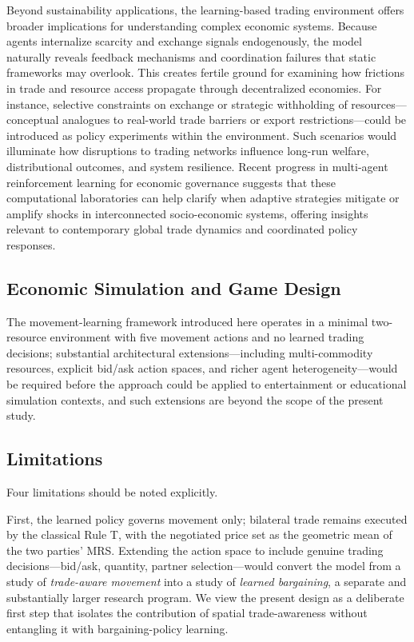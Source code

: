 \documentclass[pdflatex,sn-mathphys-num]{sn-jnl}%
\theoremstyle{thmstyleone}%
\theoremstyle{thmstyletwo}%
\theoremstyle{thmstylethree}%
\begin{document}
Beyond sustainability applications, the learning-based trading environment offers broader implications for understanding complex economic systems. Because agents internalize scarcity and exchange signals endogenously, the model naturally reveals feedback mechanisms and coordination failures that static frameworks may overlook. This creates fertile ground for examining how frictions in trade and resource access propagate through decentralized economies. For instance, selective constraints on exchange or strategic withholding of resources---conceptual analogues to real-world trade barriers or export restrictions---could be introduced as policy experiments within the environment. Such scenarios would illuminate how disruptions to trading networks influence long-run welfare, distributional outcomes, and system resilience. Recent progress in multi-agent reinforcement learning for economic governance \citep{RuddJones2025} suggests that these computational laboratories can help clarify when adaptive strategies mitigate or amplify shocks in interconnected socio-economic systems, offering insights relevant to contemporary global trade dynamics and coordinated policy responses.

\subsection{Economic Simulation and Game Design}
The movement-learning framework introduced here operates in a minimal two-resource environment with five movement actions and no learned trading decisions; substantial architectural extensions---including multi-commodity resources, explicit bid/ask action spaces, and richer agent heterogeneity---would be required before the approach could be applied to entertainment or educational simulation contexts, and such extensions are beyond the scope of the present study.

\subsection{Limitations}
\label{sec:limitations}

Four limitations should be noted explicitly.

First, the learned policy governs movement only; bilateral trade remains executed by the classical Rule T, with the negotiated price set as the geometric mean of the two parties' MRS.  
Extending the action space to include genuine trading decisions---bid/ask, quantity, partner selection---would convert the model from a study of \emph{trade-aware movement} into a study of \emph{learned bargaining}, a separate and substantially larger research program.  
We view the present design as a deliberate first step that isolates the contribution of spatial trade-awareness without entangling it with bargaining-policy learning.
\end{document}
